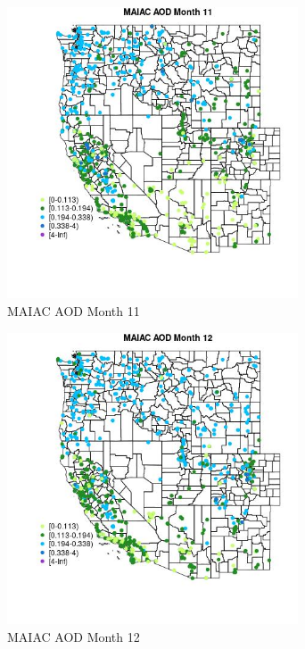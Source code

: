 \begin{figure} 
\centering  
\includegraphics[width=0.77\textwidth]{Code_Outputs/Report_ML_input_PM25_Step4_part_f_de_duplicated_aves_prioritize_24hr_obswNAs_MapObsMo11MAIAC_AOD.jpg} 
\caption{\label{fig:Report_ML_input_PM25_Step4_part_f_de_duplicated_aves_prioritize_24hr_obswNAsMapObsMo11MAIAC_AOD}MAIAC AOD Month 11} 
\end{figure} 
 

\clearpage 

\begin{figure} 
\centering  
\includegraphics[width=0.77\textwidth]{Code_Outputs/Report_ML_input_PM25_Step4_part_f_de_duplicated_aves_prioritize_24hr_obswNAs_MapObsMo12MAIAC_AOD.jpg} 
\caption{\label{fig:Report_ML_input_PM25_Step4_part_f_de_duplicated_aves_prioritize_24hr_obswNAsMapObsMo12MAIAC_AOD}MAIAC AOD Month 12} 
\end{figure} 
 

